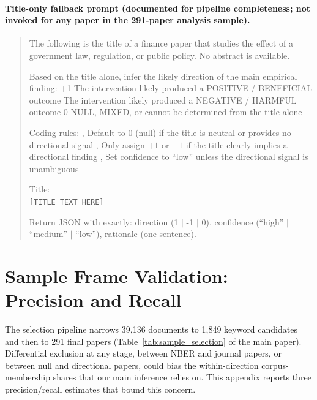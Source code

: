 \documentclass[12pt]{article}
\begin{document}
\paragraph{Title-only fallback prompt (documented for pipeline completeness; not invoked for any paper in the 291-paper analysis sample).}
\begin{quote}
\small
The following is the title of a finance paper that studies the effect of
a government law, regulation, or public policy. No abstract is available.

Based on the title alone, infer the likely direction of the main empirical finding:
\newline\quad +1 \enspace The intervention likely produced a POSITIVE / BENEFICIAL outcome
\newline{} \enspace The intervention likely produced a NEGATIVE / HARMFUL outcome
\newline\quad\phantom{+}0 \enspace NULL, MIXED, or cannot be determined from the title alone

Coding rules:
\newline, Default to 0 (null) if the title is neutral or provides no directional signal
\newline, Only assign $+1$ or $-1$ if the title clearly implies a directional finding
\newline, Set confidence to ``low'' unless the directional signal is unambiguous

Title:\\
\texttt{[TITLE TEXT HERE]}

Return JSON with exactly: direction (1 $|$ -1 $|$ 0),
confidence (``high'' $|$ ``medium'' $|$ ``low''), rationale (one sentence).
\end{quote}



\section{Sample Frame Validation: Precision and Recall}

The selection pipeline narrows 39,136 documents to 1,849 keyword
candidates and then to 291 final papers (Table~\ref{tab:sample_selection} of the main paper).
Differential exclusion at any stage, between NBER and journal papers, or
between null and directional papers, could bias the within-direction
corpus-membership shares that our main inference relies on.  This appendix
reports three precision/recall estimates that bound this concern.
\end{document}
